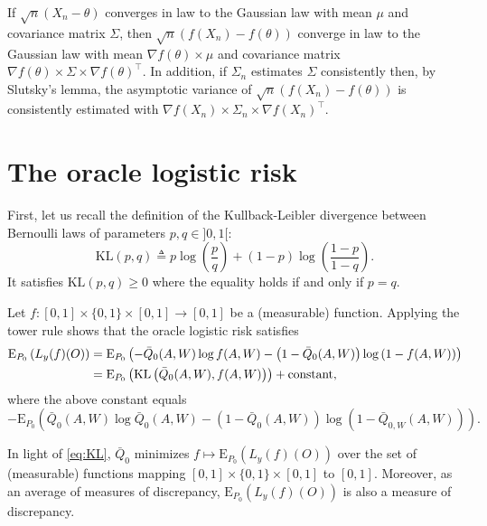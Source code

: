 \documentclass[11pt,openright,twoside]{book}
\newcommand{\Exp}{\textrm{E}}
\newcommand{\Qbar}{\bar{Q}}
\theoremstyle{definition}
\theoremstyle{definition}
\theoremstyle{definition}
\theoremstyle{remark}
\let\BeginKnitrBlock\begin \let\EndKnitrBlock\end
\begin{document}
\BeginKnitrBlock{proposition}
\protect\hypertarget{prp:unnamed-chunk-6}{}{\label{prp:unnamed-chunk-6} }If \(\sqrt{n} (X_{n} - \theta)\) converges in law to the Gaussian law with mean
\(\mu\) and covariance matrix \(\Sigma\), then \(\sqrt{n} (f(X_{n}) - f(\theta))\)
converge in law to the Gaussian law with mean \(\nabla f(\theta) \times \mu\)
and covariance matrix \(\nabla f(\theta) \times \Sigma \times \nabla f(\theta)^{\top}\). In addition, if \(\Sigma_{n}\) estimates \(\Sigma\)
consistently then, by Slutsky's lemma, the asymptotic variance of \(\sqrt{n} (f(X_{n}) - f(\theta))\) is consistently estimated with \(\nabla f(X_{n}) \times \Sigma_{n} \times \nabla f(X_{n})^{\top}\).
\EndKnitrBlock{proposition}

\hypertarget{oracle-logistic-risk}{%
\section{The oracle logistic risk}\label{oracle-logistic-risk}}

First, let us recall the definition of the Kullback-Leibler divergence between
Bernoulli laws of parameters \(p,q\in]0,1[\):
\begin{equation*}\text{KL}(p,q)  \triangleq  p \log\left(\frac{p}{q}\right)  +
(1-p) \log \left(\frac{1-p}{1-q}\right).\end{equation*}
It satisfies \(\text{KL}(p,q) \geq 0\) where the equality holds if and only if
\(p=q\).

Let \(f:[0,1] \times \{0,1\} \times [0,1] \to [0,1]\) be a (measurable)
function. Applying the tower rule shows that the oracle logistic risk
satisfies
\begin{align} 
\Exp_{P_{0}}  \left(L_{y}   (f)(O)\right)&=\Exp_{P_{0}}  \left(-\Qbar_{0}(A,W)
\log   f(A,W)   -   \left(1   -  \Qbar_{0}   (A,W)\right)   \log   \left(1   -
f(A,W)\right)\right)\notag\\&=\Exp_{P_{0}}
\left(\text{KL}\left(\Qbar_{0}(A,W),           f(A,W)\right)\right)          +
\text{constant},\label{eq:KL} 
\end{align}
where the above constant equals \begin{equation*} -\Exp_{P_{0}}\left(\Qbar_{0}(A,W) \log \Qbar_{0}(A,W) - \left(1 - \Qbar_{0} (A,W)\right) \log \left(1 - \Qbar_{0,W}(A,W)\right)\right).  \end{equation*}

In light of \eqref{eq:KL}, \(\Qbar_{0}\) minimizes \(f \mapsto \Exp_{P_{0}} \left(L_{y} (f)(O)\right)\) over the set of (measurable) functions mapping
\([0,1] \times \{0,1\} \times [0,1]\) to \([0,1]\). Moreover, as an average of
measures of discrepancy, \(\Exp_{P_{0}} \left(L_{y} (f)(O)\right)\) is also a
measure of discrepancy.
\end{document}
